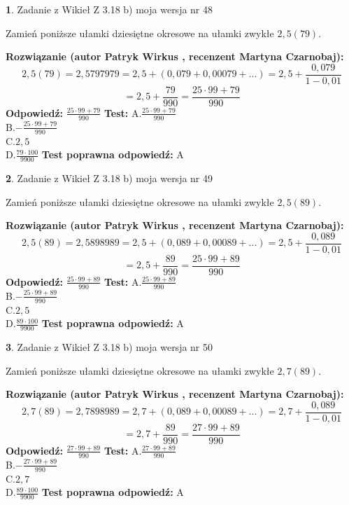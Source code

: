 \documentclass[12pt, a4paper]{article}
\theoremstyle{definition} %
\newtheorem{zad}{}
\newcommand{\zadStart}[1]{\begin{zad}#1\newline}
\newcommand{\zadStop}{\end{zad}}
\newcommand{\rozwStart}[2]{\noindent \textbf{Rozwiązanie (autor #1 , recenzent #2): }\newline}
\newcommand{\rozwStop}{\newline}
\newcommand{\odpStart}{\noindent \textbf{Odpowiedź:}\newline}
\newcommand{\odpStop}{\newline}
\newcommand{\testStart}{\noindent \textbf{Test:}\newline}
\newcommand{\testStop}{\newline}
\newcommand{\kluczStart}{\noindent \textbf{Test poprawna odpowiedź:}\newline}
\newcommand{\kluczStop}{\newline}
\begin{document}
\zadStart{Zadanie z Wikieł Z 3.18 b) moja wersja nr 48}

Zamień poniższe ułamki dziesiętne okresowe na ułamki zwykłe $2,5(79)$.
\zadStop
\rozwStart{Patryk Wirkus}{Martyna Czarnobaj}
$$2,5(79)=2,5797979=2,5+(0,079+0,00079+...)=2,5+\frac{0,079}{1-0,01}$$
$$=2,5+\frac{79}{990}=\frac{25\cdot99+79}{990}$$
\rozwStop
\odpStart
$\frac{25\cdot99+79}{990}$
\odpStop
\testStart
A.$\frac{25\cdot99+79}{990}$\\ B.$-\frac{25\cdot99+79}{990}$\\ C.$2,5$\\ D.$\frac{79\cdot100}{9900}$
\testStop
\kluczStart
A
\kluczStop



\zadStart{Zadanie z Wikieł Z 3.18 b) moja wersja nr 49}

Zamień poniższe ułamki dziesiętne okresowe na ułamki zwykłe $2,5(89)$.
\zadStop
\rozwStart{Patryk Wirkus}{Martyna Czarnobaj}
$$2,5(89)=2,5898989=2,5+(0,089+0,00089+...)=2,5+\frac{0,089}{1-0,01}$$
$$=2,5+\frac{89}{990}=\frac{25\cdot99+89}{990}$$
\rozwStop
\odpStart
$\frac{25\cdot99+89}{990}$
\odpStop
\testStart
A.$\frac{25\cdot99+89}{990}$\\ B.$-\frac{25\cdot99+89}{990}$\\ C.$2,5$\\ D.$\frac{89\cdot100}{9900}$
\testStop
\kluczStart
A
\kluczStop



\zadStart{Zadanie z Wikieł Z 3.18 b) moja wersja nr 50}

Zamień poniższe ułamki dziesiętne okresowe na ułamki zwykłe $2,7(89)$.
\zadStop
\rozwStart{Patryk Wirkus}{Martyna Czarnobaj}
$$2,7(89)=2,7898989=2,7+(0,089+0,00089+...)=2,7+\frac{0,089}{1-0,01}$$
$$=2,7+\frac{89}{990}=\frac{27\cdot99+89}{990}$$
\rozwStop
\odpStart
$\frac{27\cdot99+89}{990}$
\odpStop
\testStart
A.$\frac{27\cdot99+89}{990}$\\ B.$-\frac{27\cdot99+89}{990}$\\ C.$2,7$\\ D.$\frac{89\cdot100}{9900}$
\testStop
\kluczStart
A
\kluczStop
\end{document}
